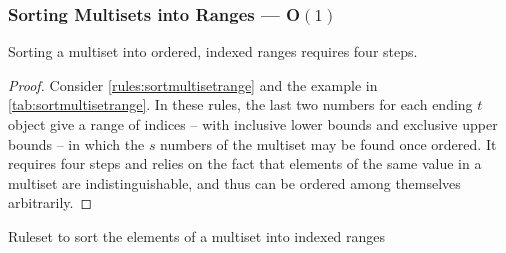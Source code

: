 \subsubsection{Sorting Multisets into Ranges --- O\((1)\)}\label{sec:sortmultisetrange}

\begin{proposition}\label{prop:sortmultisetrange}
Sorting a multiset into ordered, indexed ranges requires four steps.
\end{proposition}

\begin{proof}
Consider \cref{rules:sortmultisetrange} and the example in \cref{tab:sortmultisetrange}.  In these rules, the last two numbers for each ending \(t\) object give a range of indices -- with inclusive lower bounds and exclusive upper bounds -- in which the \(s\) numbers of the multiset may be found once ordered.  It requires four steps and relies on the fact that elements of the same value in a multiset are indistinguishable, and thus can be ordered among themselves arbitrarily.
\end{proof}

\cpresetrulenumber
\begin{cprulesetfloat} \begin{cpruleset}





\end{cpruleset}
\caption{\label{rules:sortmultisetrange}Ruleset to sort the elements of a multiset into indexed ranges}
\end{cprulesetfloat}


